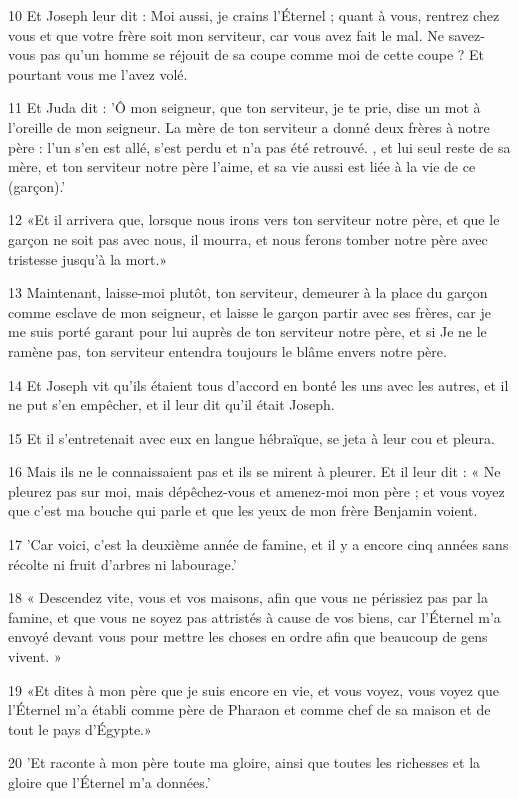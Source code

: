 \par 10 Et Joseph leur dit : Moi aussi, je crains l'Éternel ; quant à vous, rentrez chez vous et que votre frère soit mon serviteur, car vous avez fait le mal. Ne savez-vous pas qu'un homme se réjouit de sa coupe comme moi de cette coupe ? Et pourtant vous me l’avez volé.
\par 11 Et Juda dit : 'Ô mon seigneur, que ton serviteur, je te prie, dise un mot à l'oreille de mon seigneur. La mère de ton serviteur a donné deux frères à notre père : l'un s'en est allé, s'est perdu et n'a pas été retrouvé. , et lui seul reste de sa mère, et ton serviteur notre père l'aime, et sa vie aussi est liée à la vie de ce (garçon).'
\par 12 «Et il arrivera que, lorsque nous irons vers ton serviteur notre père, et que le garçon ne soit pas avec nous, il mourra, et nous ferons tomber notre père avec tristesse jusqu'à la mort.»
\par 13 Maintenant, laisse-moi plutôt, ton serviteur, demeurer à la place du garçon comme esclave de mon seigneur, et laisse le garçon partir avec ses frères, car je me suis porté garant pour lui auprès de ton serviteur notre père, et si Je ne le ramène pas, ton serviteur entendra toujours le blâme envers notre père.
\par 14 Et Joseph vit qu'ils étaient tous d'accord en bonté les uns avec les autres, et il ne put s'en empêcher, et il leur dit qu'il était Joseph.
\par 15 Et il s'entretenait avec eux en langue hébraïque, se jeta à leur cou et pleura.
\par 16 Mais ils ne le connaissaient pas et ils se mirent à pleurer. Et il leur dit : « Ne pleurez pas sur moi, mais dépêchez-vous et amenez-moi mon père ; et vous voyez que c'est ma bouche qui parle et que les yeux de mon frère Benjamin voient.
\par 17 'Car voici, c'est la deuxième année de famine, et il y a encore cinq années sans récolte ni fruit d'arbres ni labourage.'
\par 18 « Descendez vite, vous et vos maisons, afin que vous ne périssiez pas par la famine, et que vous ne soyez pas attristés à cause de vos biens, car l'Éternel m'a envoyé devant vous pour mettre les choses en ordre afin que beaucoup de gens vivent. »
\par 19 «Et dites à mon père que je suis encore en vie, et vous voyez, vous voyez que l'Éternel m'a établi comme père de Pharaon et comme chef de sa maison et de tout le pays d'Égypte.»
\par 20 'Et raconte à mon père toute ma gloire, ainsi que toutes les richesses et la gloire que l'Éternel m'a données.'
